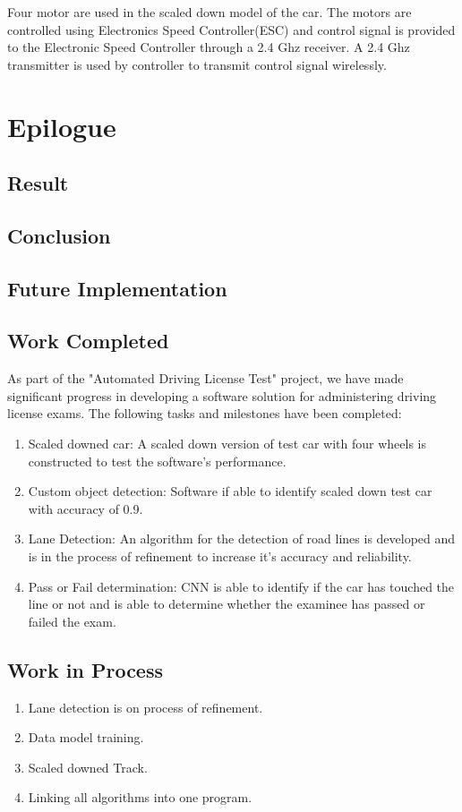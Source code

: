 Four motor are used in the scaled down model of the car. The motors are controlled using Electronics Speed Controller(ESC) and control signal is provided to the Electronic Speed Controller through a 2.4 Ghz receiver. A 2.4 Ghz transmitter is used by controller to transmit control signal wirelessly. 

\chapter{Epilogue}
\section{Result}
\section{Conclusion}
\section{Future Implementation}


\section{Work Completed}
As part of the "Automated Driving License Test" project, we have made significant progress in developing a software solution for administering driving license exams. The following tasks and milestones have been completed:
\begin{enumerate}
\item Scaled downed car: A scaled down version of test car with four wheels is constructed to test the software's performance.  
\item Custom object detection: Software if able to identify scaled down test car with accuracy of 0.9.
\item Lane Detection: An algorithm for the detection of road lines is developed and is in the process of refinement to increase it's accuracy and 	reliability. 
\item Pass or Fail determination: CNN is able to identify if the car has touched the line or not and is able to determine whether the examinee has passed or failed the exam. 
\end{enumerate}


\section{Work in Process}
\begin{enumerate}
\item Lane detection is on process of refinement.
\item Data model training.
\item Scaled downed Track.
\item Linking all algorithms into one program.
\end{enumerate}

